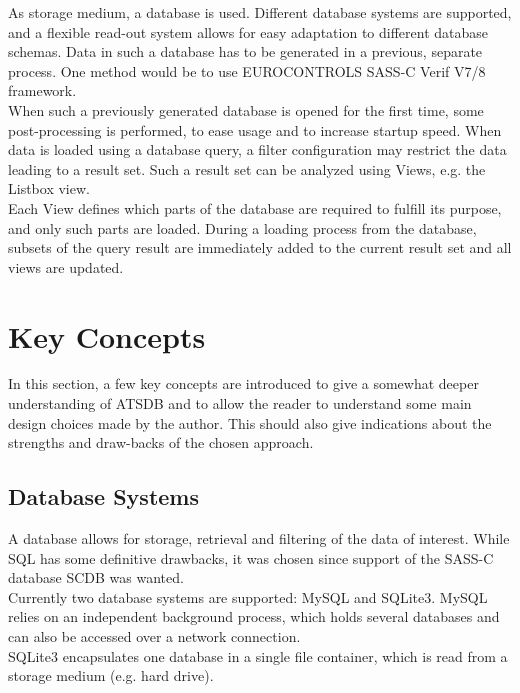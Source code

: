 \documentclass[10pt,letterpaper,extrafontsizes]{memoir}
\begin{document}
As storage medium, a database is used.  Different database systems are supported, and a flexible read-out system allows for easy adaptation to different database schemas.  Data in such a database has to be generated in a previous, separate process.  One method would be to use EUROCONTROLS SASS-C  Verif V7/8 framework.\\

When such a previously generated database is opened for the first time, some post-processing is performed, to ease usage and to increase startup speed.  When data is loaded using a database query, a filter configuration may restrict the data leading to a result set.  Such a result set can be analyzed using Views, e.g. the Listbox view.\\

Each View defines which parts of the database are required to fulfill its purpose, and only such parts are loaded.  During a loading process from the database, subsets of the query result are immediately added to the current result set and all views are updated.

\chapter{Key Concepts}
\label{cha:key_concepts}

In this section, a few key concepts are introduced to give a somewhat deeper understanding of ATSDB and to allow the reader to understand some main design choices made by the author. This should also give indications about the strengths and draw-backs of the chosen approach.

\section*{Database Systems}
A database allows for storage, retrieval and filtering of the data of interest. While SQL has some definitive drawbacks, it was chosen since support of the SASS-C database SCDB was wanted.\\
Currently  two  database  systems  are  supported:  MySQL  and  SQLite3.   MySQL  relies  on  an  independent background process, which holds several databases and can also be accessed over a network connection.\\
SQLite3 encapsulates one database in a single file container, which is read from a storage medium (e.g. hard drive).
\end{document}
